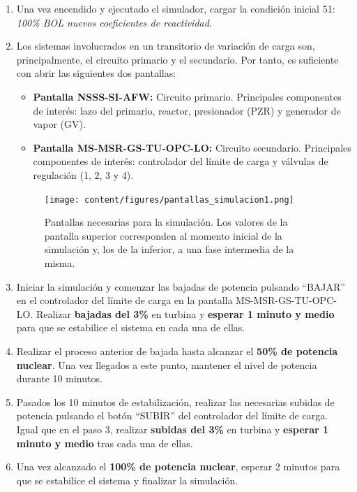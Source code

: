 \begin{enumerate}
  \item Una vez encendido y ejecutado el simulador, cargar la condición inicial 51: \textit{100\% BOL nuevos coeficientes de reactividad}.
  
  \item Los sistemas involucrados en un transitorio de variación de carga son, principalmente, el circuito primario y el secundario. Por tanto, es suficiente con abrir las siguientes dos pantallas:
  \begin{itemize}
    \item \textbf{Pantalla NSSS-SI-AFW:} Circuito primario. Principales componentes de interés: lazo del primario, reactor, presionador (PZR) y generador de vapor (GV).
    \item \textbf{Pantalla MS-MSR-GS-TU-OPC-LO:} Circuito secundario. Principales componentes de interés: controlador del límite de carga y válvulas de regulación (1, 2, 3 y 4).
    \end{itemize}

  \begin{figure}[h]
    \centering
    \texttt{[image: content/figures/pantallas\_simulacion1.png]}
    \caption{Pantallas necesarias para la simulación. Los valores de la pantalla superior corresponden al momento inicial de la simulación y, los de la inferior, a una fase intermedia de la misma.}
    \label{fig:pantallas_simulacion1}
  \end{figure}

  \item Iniciar la simulación y comenzar las bajadas de potencia pulsando ``BAJAR'' en el controlador del límite de carga en la pantalla MS-MSR-GS-TU-OPC-LO. Realizar \textbf{bajadas del 3\%} en turbina y \textbf{esperar 1 minuto y medio} para que se estabilice el sistema en cada una de ellas. 
  \item Realizar el proceso anterior de bajada hasta alcanzar el \textbf{50\% de potencia nuclear}. Una vez llegados a este punto, mantener el nivel de potencia durante 10 minutos.
  \item Pasados los 10 minutos de estabilización, realizar las necesarias subidas de potencia pulsando el botón ``SUBIR'' del controlador del límite de carga. Igual que en el paso 3, realizar \textbf{subidas del 3\%} en turbina y \textbf{esperar 1 minuto y medio} tras cada una de ellas.
  \item Una vez alcanzado el \textbf{100\% de potencia nuclear}, esperar 2 minutos para que se estabilice el sistema y finalizar la simulación.
\end{enumerate}  

